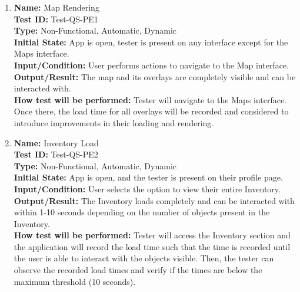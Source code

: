 \documentclass[12pt, titlepage]{article}
\begin{document}
\begin{enumerate}

  \item \textbf{Name:} Map Rendering \label{itm:Test-QS-PE1} \\
        \textbf{Test ID:} Test-QS-PE1 \\
        \textbf{Type:} Non-Functional, Automatic, Dynamic \\
        \textbf{Initial State:} App is open, tester is present on any interface except for the Maps interface. \\
        \textbf{Input/Condition:} User performs actions to navigate to the Map interface. \\
        \textbf{Output/Result:} The map and its overlays are completely visible and can be interacted with. \\
        \textbf{How test will be performed:} Tester will navigate to the Maps interface. Once there, the load time for all overlays will be recorded and considered to introduce improvements in their loading and rendering. \\

  \item \textbf{Name:} Inventory Load \label{itm:Test-QS-PE2} \\
        \textbf{Test ID:} Test-QS-PE2 \\
        \textbf{Type:} Non-Functional, Automatic, Dynamic \\
        \textbf{Initial State:} App is open, and the tester is present on their profile page. \\
        \textbf{Input/Condition:} User selects the option to view their entire Inventory. \\
        \textbf{Output/Result:} The Inventory loads completely and can be interacted with within 1-10 seconds depending on the number of objects present in the Inventory. \\
        \textbf{How test will be performed:} Tester will access the Inventory section and the application will record the load time such that the time is recorded until the user is able to interact with the objects visible. Then, the tester can observe the recorded load times and verify if the times are below the maximum threshold (10 seconds). \\


\end{enumerate}
\end{document}
